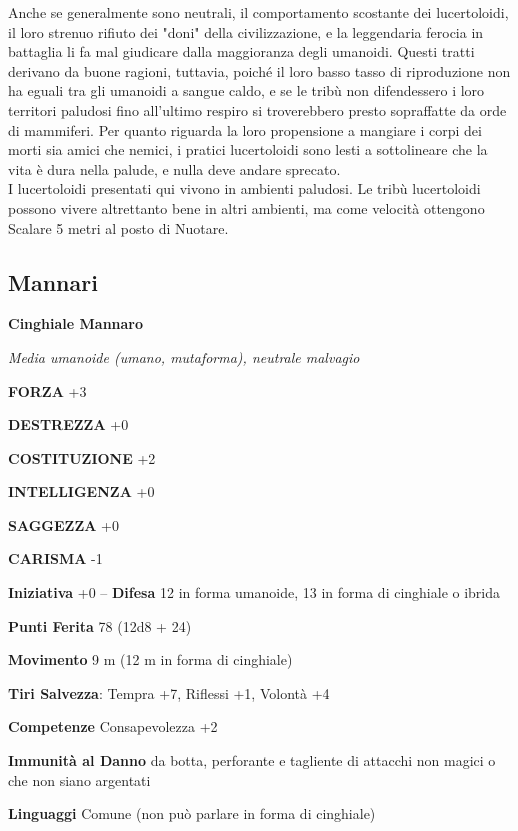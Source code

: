 \begin{multicols}{2}
Anche se generalmente sono neutrali, il comportamento scostante dei lucertoloidi, il loro strenuo rifiuto dei "doni" della civilizzazione, e la leggendaria ferocia in battaglia li fa mal giudicare dalla maggioranza degli umanoidi. Questi tratti derivano da buone ragioni, tuttavia, poiché il loro basso tasso di riproduzione non ha eguali tra gli umanoidi a sangue caldo, e se le tribù non difendessero i loro territori paludosi fino all'ultimo respiro si troverebbero presto sopraffatte da orde di mammiferi. Per quanto riguarda la loro propensione a mangiare i corpi dei morti sia amici che nemici, i pratici lucertoloidi sono lesti a sottolineare che la vita è dura nella palude, e nulla deve andare sprecato.\\

I lucertoloidi presentati qui vivono in ambienti paludosi. Le tribù lucertoloidi possono vivere altrettanto bene in altri ambienti, ma come velocità ottengono Scalare 5 metri al posto di Nuotare.\\



\subsection{Mannari}

\medskip{}\textbf{Cinghiale Mannaro}

\emph{Media umanoide (umano, mutaforma), neutrale malvagio}

\textbf{FORZA} +3

\textbf{DESTREZZA} +0

\textbf{COSTITUZIONE} +2

\textbf{INTELLIGENZA} +0

\textbf{SAGGEZZA} +0

\textbf{CARISMA} -1

\textbf{Iniziativa} +0 -- \textbf{Difesa} 12 in forma umanoide, 13 in forma di cinghiale o ibrida

\textbf{Punti Ferita} 78 (12d8 + 24)

\textbf{Movimento} 9 m (12 m in forma di cinghiale)

\textbf{Tiri Salvezza}: Tempra +7, Riflessi +1, Volontà +4

\textbf{Competenze} Consapevolezza +2

\textbf{Immunità al Danno} da botta, perforante e tagliente di attacchi non magici o che non siano argentati 

\textbf{Linguaggi} Comune (non può parlare in forma di cinghiale)


\end{multicols}
